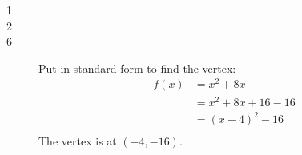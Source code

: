 \documentclass{exam}
\begin{document}
  \begin{description}
    \item[1] 

    \item[2] 

%
%

    \item[6]
      Put in standard form to find the vertex:
      \begin{align*}
        f(x) &= x^2 + 8x \\
             &= x^2 + 8x + 16 - 16 \\
             &= (x + 4)^2 - 16 \\
      \end{align*}
      The vertex is at $(-4, -16)$.


\end{description}
\end{document}
